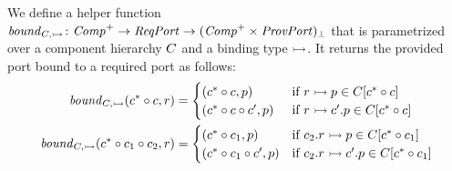 \documentclass[a4paper,10pt,english]{article}
\begin{document}
We define a helper function $\mathit{bound}_{C, \mathtt{\rightarrowtail}} \colon \mathit{Comp}^+ \rightarrow \mathit{ReqPort}
\rightarrow (\mathit{Comp}^+ \times \mathit{ProvPort})_\bot$ that is parametrized over a component hierarchy $C$ and a
binding type $\mathtt{\rightarrowtail}$. It returns the provided port bound to a required port as follows:
\begin{align*}
	\mathit{bound}_{C, \mathtt{\rightarrowtail}}(c^* \circ c, r) &=
		\begin{cases}
			(c^* \circ c, p) & \; \, \text{if } 
				r \; \mathtt{\rightarrowtail} \; p \in
				C[c^* \circ c] \\
			(c^* \circ c \circ c', p) & \; \, \text{if } 
				r \; \mathtt{\rightarrowtail} \; c'\mathtt{.}p \in
				C[c^* \circ c]
		\end{cases} \\
	\mathit{bound}_{C, \mathtt{\rightarrowtail}}(c^* \circ c_1 \circ c_2, r) &=
		\begin{cases}
			(c^* \circ c_1, p) & \text{if } 
				c_2\mathtt{.}r \; \mathtt{\rightarrowtail} \; p \in
				C[c^* \circ c_1] \\
			(c^* \circ c_1 \circ c', p) & \text{if } 
				c_2\mathtt{.}r \; \mathtt{\rightarrowtail} \; c'\mathtt{.}p \in
				C[c^* \circ c_1]
		\end{cases}
\end{align*}
\end{document}
